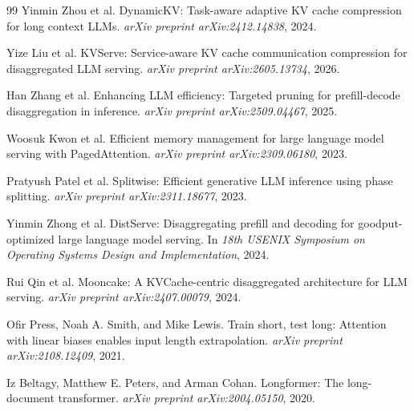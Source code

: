 \documentclass[11pt]{article}
\theoremstyle{definition}
\theoremstyle{plain}
\begin{document}
\begin{thebibliography}{99}
Yinmin Zhou et al.
\newblock DynamicKV: Task-aware adaptive KV cache compression for long context LLMs.
\newblock \emph{arXiv preprint arXiv:2412.14838}, 2024.

Yize Liu et al.
\newblock KVServe: Service-aware KV cache communication compression for disaggregated LLM serving.
\newblock \emph{arXiv preprint arXiv:2605.13734}, 2026.

Han Zhang et al.
\newblock Enhancing LLM efficiency: Targeted pruning for prefill-decode disaggregation in inference.
\newblock \emph{arXiv preprint arXiv:2509.04467}, 2025.

Woosuk Kwon et al.
\newblock Efficient memory management for large language model serving with PagedAttention.
\newblock \emph{arXiv preprint arXiv:2309.06180}, 2023.

Pratyush Patel et al.
\newblock Splitwise: Efficient generative LLM inference using phase splitting.
\newblock \emph{arXiv preprint arXiv:2311.18677}, 2023.

Yinmin Zhong et al.
\newblock DistServe: Disaggregating prefill and decoding for goodput-optimized large language model serving.
\newblock In \emph{18th USENIX Symposium on Operating Systems Design and Implementation}, 2024.

Rui Qin et al.
\newblock Mooncake: A KVCache-centric disaggregated architecture for LLM serving.
\newblock \emph{arXiv preprint arXiv:2407.00079}, 2024.

Ofir Press, Noah A. Smith, and Mike Lewis.
\newblock Train short, test long: Attention with linear biases enables input length extrapolation.
\newblock \emph{arXiv preprint arXiv:2108.12409}, 2021.

Iz Beltagy, Matthew E. Peters, and Arman Cohan.
\newblock Longformer: The long-document transformer.
\newblock \emph{arXiv preprint arXiv:2004.05150}, 2020.

\end{thebibliography}
\end{document}
